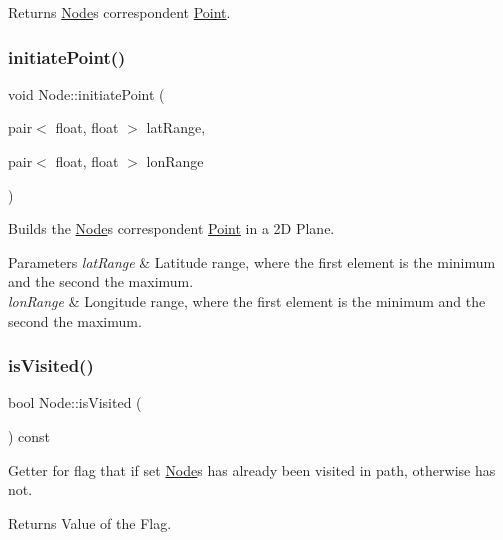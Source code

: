 \begin{DoxyReturn}{Returns}
\hyperlink{class_node}{Node}\textquotesingle{}s correspondent \hyperlink{class_point}{Point}. 
\end{DoxyReturn}
\hypertarget{class_node_a599f948564fa9f0cb358fe030161eb1e}{}\label{class_node_a599f948564fa9f0cb358fe030161eb1e} 
\subsubsection{\texorpdfstring{initiate\+Point()}{initiatePoint()}}
{\footnotesize\ttfamily void Node\+::initiate\+Point (\begin{DoxyParamCaption}\item[{pair$<$ float, float $>$}]{lat\+Range,  }\item[{pair$<$ float, float $>$}]{lon\+Range }\end{DoxyParamCaption})}

Builds the \hyperlink{class_node}{Node}\textquotesingle{}s correspondent \hyperlink{class_point}{Point} in a 2D Plane.


\begin{DoxyParams}{Parameters}
{\em lat\+Range} & Latitude range, where the first element is the minimum and the second the maximum. \\
\hline
{\em lon\+Range} & Longitude range, where the first element is the minimum and the second the maximum. \\
\hline
\end{DoxyParams}
\hypertarget{class_node_a97dd8f95e09a0516f8939627f94bd58e}{}\label{class_node_a97dd8f95e09a0516f8939627f94bd58e} 
\subsubsection{\texorpdfstring{is\+Visited()}{isVisited()}}
{\footnotesize\ttfamily bool Node\+::is\+Visited (\begin{DoxyParamCaption}{ }\end{DoxyParamCaption}) const}

Getter for flag that if set \hyperlink{class_node}{Node}\textquotesingle{}s has already been visited in path, otherwise has not.

\begin{DoxyReturn}{Returns}
Value of the Flag. 
\end{DoxyReturn}
\hypertarget{class_node_a4c78d9813537ccfc829401f979176428}{}\label{class_node_a4c78d9813537ccfc829401f979176428} 
